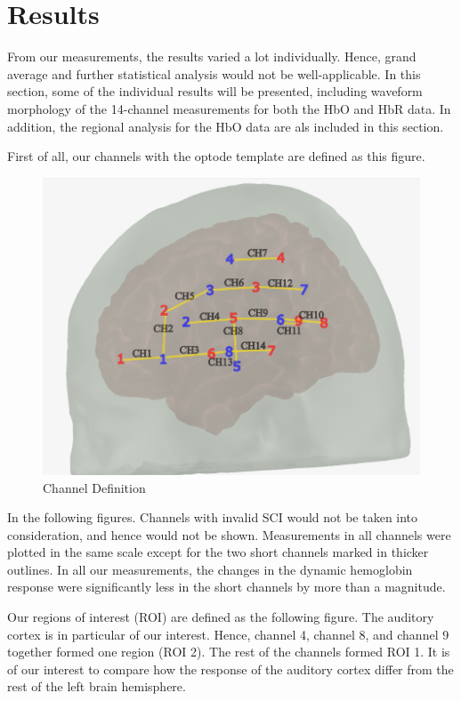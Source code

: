 \chapter{Results}

From our measurements, the results varied a lot individually. Hence, grand average and further statistical analysis would not be well-applicable. In this section, some of the individual results will be presented, including waveform morphology of the 14-channel measurements for both the HbO and HbR data. In addition, the regional analysis for the HbO data are als included in this section.

First of all, our channels with the optode template are defined as this figure.

\begin{figure}[H]
  \centering
    \includegraphics[scale=.48]{bilder/optode_ink.png}
  \caption{Channel Definition}
  \label{fig:somesignal}
\end{figure}

In the following figures. Channels with invalid SCI would not be taken into consideration, and hence would not be shown. Measurements in all channels were plotted in the same scale except for the two short channels marked in thicker outlines. In all our measurements, the changes in the dynamic hemoglobin response were significantly less in the short channels by more than a magnitude.

Our regions of interest (ROI) are defined as the following figure. The auditory cortex is in particular of our interest. Hence, channel 4, channel 8, and channel 9 together formed one region (ROI 2). The rest of the channels formed ROI 1. It is of our interest to compare how the response of the auditory cortex differ from the rest of the left brain hemisphere.


